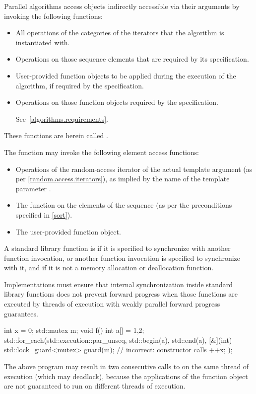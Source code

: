 \pnum
Parallel algorithms access objects indirectly accessible via their arguments
by invoking the following functions:
\begin{itemize}
\item
  All operations of the categories of the iterators
  that the algorithm is instantiated with.
\item
  Operations on those sequence elements that are required by its specification.
\item
  User-provided function objects
  to be applied during the execution of the algorithm,
  if required by the specification.
\item
  Operations on those function objects required by the specification.
\begin{note}
See~\ref{algorithms.requirements}.
\end{note}
\end{itemize}
These functions are herein called .
\begin{example}
The  function may invoke the following element access functions:
\begin{itemize}
\item
  Operations of the random-access iterator of the actual template argument
  (as per \ref{random.access.iterators}),
  as implied by the name of the template parameter .
\item
  The  function on the elements of the sequence
  (as per the preconditions specified in \ref{sort}).
\item
  The user-provided  function object.
\end{itemize}
\end{example}

\pnum
A standard library function is 
if it is specified to synchronize with another function invocation, or
another function invocation is specified to synchronize with it,
and if it is not a memory allocation or deallocation function.
\begin{note}
Implementations must ensure that internal synchronization
inside standard library functions does not prevent forward progress
when those functions are executed by threads of execution
with weakly parallel forward progress guarantees.
\end{note}
\begin{example}
\begin{codeblock}
int x = 0;
std::mutex m;
void f() {
  int a[] = {1,2};
  std::for_each(std::execution::par_unseq, std::begin(a), std::end(a), [&](int) {
    std::lock_guard<mutex> guard(m);            // incorrect:  constructor calls 
  ++x;
  });
}
\end{codeblock}
The above program may result in two consecutive calls to 
on the same thread of execution (which may deadlock),
because the applications of the function object are not guaranteed
to run on different threads of execution.
\end{example}

